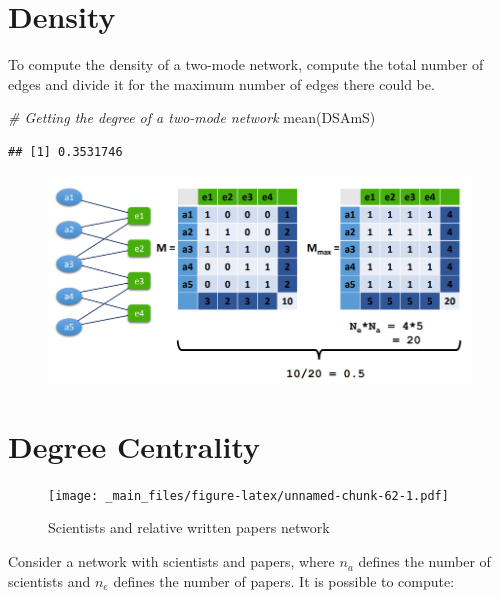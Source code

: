 \documentclass[
  notitlepage,
  onecolumn,
  openany]{book}
\newenvironment{Shaded}{\begin{snugshade}}{\end{snugshade}}
\newcommand{\CommentTok}[1]{\textcolor[rgb]{0.56,0.35,0.01}{\textit{#1}}}
\newcommand{\FunctionTok}[1]{\textcolor[rgb]{0.00,0.00,0.00}{#1}}
\newcommand{\NormalTok}[1]{#1}
\begin{document}
\hypertarget{density-1}{%
\section{Density}\label{density-1}}

To compute the density of a two-mode network, compute the total number of edges and divide it for the maximum number of edges there could be.

\begin{Shaded}
\begin{Highlighting}[]
\CommentTok{\# Getting the degree of a two{-}mode network}
\FunctionTok{mean}\NormalTok{(DSAmS)}
\end{Highlighting}
\end{Shaded}

\begin{verbatim}
## [1] 0.3531746
\end{verbatim}

\begin{figure}[h!]

{\centering \includegraphics[width=0.7\linewidth]{images/10-Two mode networks/Untitled 3} 

}

\end{figure}

\hypertarget{degree-centrality-2}{%
\section{Degree Centrality}\label{degree-centrality-2}}

\begin{figure}
\centering
\texttt{[image: \_main\_files/figure-latex/unnamed-chunk-62-1.pdf]}
\caption{\label{fig:unnamed-chunk-62}Scientists and relative written papers network}
\end{figure}

Consider a network with scientists and papers, where \(n_a\) defines the number of scientists and \(n_e\) defines the number of papers. It is possible to compute:
\end{document}
